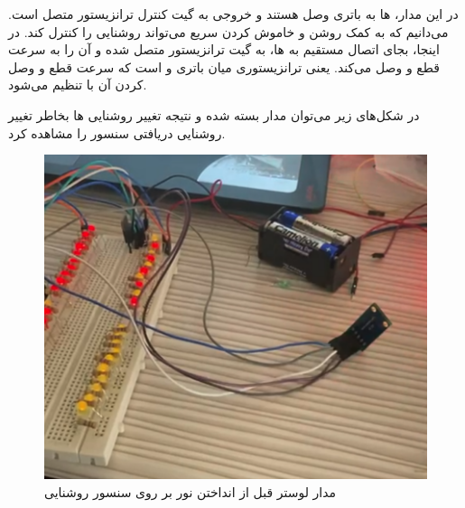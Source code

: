 \documentclass[12pt,a4paper]{article}
\begin{document}
در این مدار،  ها به باتری وصل هستند و خروجی  به گیت کنترل ترانزیستور  متصل است. می‌دانیم که  به کمک روشن و خاموش کردن سریع می‌تواند روشنایی را کنترل کند. در اینجا، بجای اتصال مستقیم  به  ها، به گیت ترانزیستور متصل شده و آن را به سرعت قطع و وصل می‌کند. یعنی ترانزیستوری میان باتری و  است که سرعت قطع و وصل کردن آن با  تنظیم می‌شود.

در شکل‌های زیر می‌توان مدار بسته شده و نتیجه تغییر روشنایی  ها بخاطر تغییر روشنایی دریافتی سنسور را مشاهده کرد.

 \begin{figure}[H]
	\centering
	\includegraphics[scale=0.57]{figs/on.png}
	\caption{
		مدار لوستر قبل از انداختن نور بر روی سنسور روشنایی
	}
	\label{fig:schema1}
\end{figure}
\end{document}
